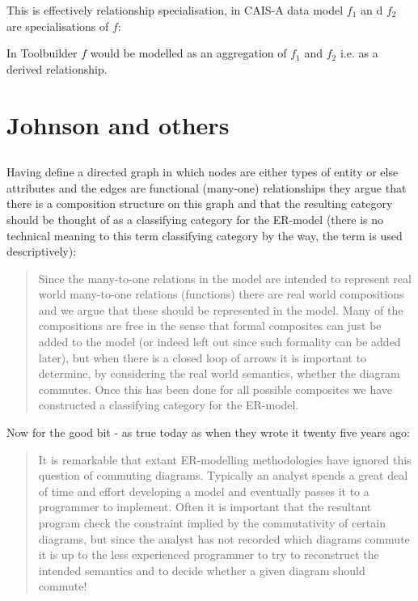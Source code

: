 \documentclass[11pt,a4paper]{scrartcl}
\renewcommand{\erpictureFolder}[0]{../SharedPictures}
\begin{document}
This is effectively relationship specialisation, in CAIS-A
 data model $f_1$ an d $f_2$ are specialisations of $f$: 

\begin{center}

\end{center}
In Toolbuilder $f$ would be modelled as an aggregation of $f_1$ and $f_2$ i.e. as 
a derived relationship.

\section {Johnson and others}
\subsection{\cite{Johnson93}      }
Having define a directed graph in which nodes are either types of entity or
else attributes and the edges are functional (many-one) relationships
they argue that there is a composition structure on this graph
and that the resulting category should be thought of as a classifying category
for the ER-model (there is no technical meaning to this term classifying category by the way, 
the term is used descriptively):
\begin{quote}
Since the many-to-one relations in the
model are intended to represent real world many-to-one relations (functions)
there are real world compositions and we argue that these should be represented
in the model. Many of the compositions are free in the sense that formal 
composites can just be added to the model (or indeed left out since such formality
can be added later), but when there is a closed loop of arrows it is important to
determine, by considering the real world semantics, whether the diagram commutes. 
Once this has been done for all possible composites we have constructed
a classifying category for the ER-model.
\end{quote}

Now for the good bit - as true today as when they wrote it twenty five years ago:
\begin{quote}
It is remarkable that extant ER-modelling methodologies have ignored this
question of commuting diagrams. Typically an analyst spends a great deal of
time and effort developing a model and eventually passes it to a programmer
to implement. Often it is important that the resultant program check the 
constraint implied by the commutativity of certain diagrams, but since the analyst
has not recorded which diagrams commute it is up to the less experienced 
programmer to try to reconstruct the intended semantics and to decide whether a
given diagram should commute!
\end{quote}
\end{document}
